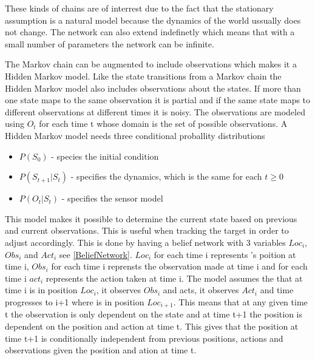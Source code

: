 These kinds of chains are of interrest due to the fact that the stationary
assumption is a natural model because the dynamics of the world ussually does
not change. The network can also extend indefinetly which means that with a
small number of parameters the network can be infinite.\nl

The Markov chain can be augmented to include observations which makes it a
Hidden Markov model. Like the state transitions from a Markov chain the Hidden
Markov model also includes observations about the states. If more than one state
maps to the same observation it is partial and if the same state maps to
different observations at different times it is noisy. The observations are
modeled using $O_t$ for each time t whose domain is the set of possible
observations. A Hidden Markov model needs three conditional proballity
distributions
\begin{itemize}
  \item $P(S_0)$ - species the initial condition
  \item $P(S_{t+1}|S_t)$ - specifies the dynamics, which is the same for each $t
  \geq 0$
  \item $P(O_t|S_t)$ - specifies the sensor model
\end{itemize}

This model makes it possible to determine the current state based on previous
and current observations. This is useful when tracking the target in order to
adjust \namep accordingly. This is done by having a belief network with 3
variables $Loc_i$, $Obs_i$ and $Act_i$ see \autoref{BeliefNetwork}. $Loc_i$ for
each time i represents \name's poition at time i, $Obs_i$ for each time i reprensts the observation
made at time i and for each time i $act_i$ represents the action taken at time
i. The model assumes the that at time i \namep is in position $Loc_i$, it
observes $Obs_i$ and acts, it observes $Act_i$ and time progresses to i+1 where
\namep is in position $Loc_{i+1}$. This means that at any given time t the
observation is only dependent on the state and at time t+1 the position is
dependent on the position and action at time t. This gives that the position
at time t+1 is conditionally independent from previous positions, actions and
observations given the position and ation at time t. 


